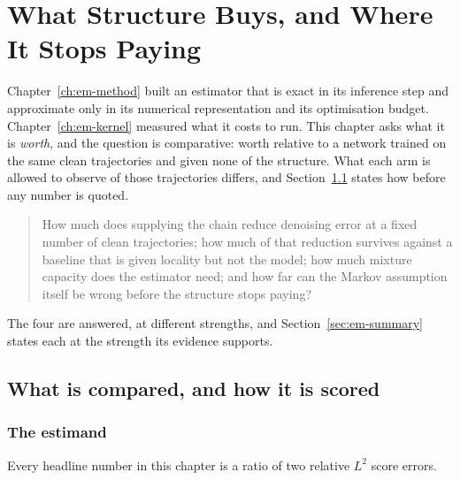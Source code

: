 \chapter{What Structure Buys, and Where It Stops Paying}
\label{ch:em-results}

Chapter~\ref{ch:em-method} built an estimator that is exact in its inference
step and approximate only in its numerical representation and its optimisation
budget. Chapter~\ref{ch:em-kernel} measured what it costs to run. This chapter
asks what it is \emph{worth}, and the question is comparative: worth relative to
a network trained on the same clean trajectories and given none of the
structure. What each arm is allowed to observe of those trajectories differs,
and Section~\ref{sec:em-estimand} states how before any number is quoted.

\begin{quote}
How much does supplying the chain reduce denoising error at a fixed number of
clean trajectories; how much of that reduction survives against a baseline that is given
locality but not the model; how much mixture capacity does the estimator need;
and how far can the Markov assumption itself be wrong before the structure
stops paying?
\end{quote}

\noindent The four are answered, at different strengths, and
Section~\ref{sec:em-summary} states each at the strength its evidence supports.

\section{What is compared, and how it is scored}\label{sec:em-estimand}

\subsection{The estimand}

Every headline number in this chapter is a ratio of two relative $L^2$ score
errors.

